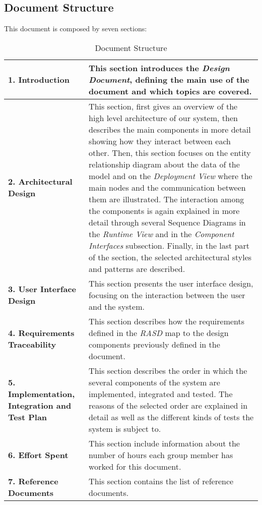 \clearpage
\subsection{Document Structure}
This document is composed by seven sections:

\begin{center}
\centering
\begin{table}[H]
\centering
\begin{tabular} { p{4cm}  p{10 cm} }
\toprule
\textbf{1. Introduction} & This section introduces the \textit{Design Document}, defining the main use of the document and which topics are covered.                                                                                                                                  \\ \midrule
\textbf{2. Architectural Design} & This section, first gives an overview of the high level architecture of our system, then describes the main components in more detail showing how they interact between each other. Then, this section focuses on the entity relationship diagram about the data of the model and on the \textit{Deployment View} where the main nodes and the communication between them are illustrated. The interaction among the components is again explained in more detail through several Sequence Diagrams in the \textit{Runtime View} and in the \textit{Component Interfaces} subsection. Finally, in the last part of the section, the selected architectural styles and patterns are described. \\ \midrule
\textbf{3. User Interface Design} &  This section presents the user interface design, focusing on the interaction between the user and the system.  \\ \midrule
\textbf{4. Requirements Traceability}  & This section describes how the requirements defined in the \textit{RASD} map to the design components previously defined in the document.\\ \midrule
\textbf{5. Implementation, Integration and Test Plan} &  This section describes the order in which the several components of the system are implemented, integrated and tested. The reasons of the selected order are explained in detail as well as the different kinds of tests the system is subject to.
\\ \midrule
\textbf {6. Effort Spent} & This section include information about the number of hours each group member has worked for this document. \\ \midrule
\textbf{7. Reference Documents} & This section contains the list of  reference documents. \\ \bottomrule
\end{tabular}
\caption{Document Structure}
\end{table}
\clearpage
\end{center}
\clearpage